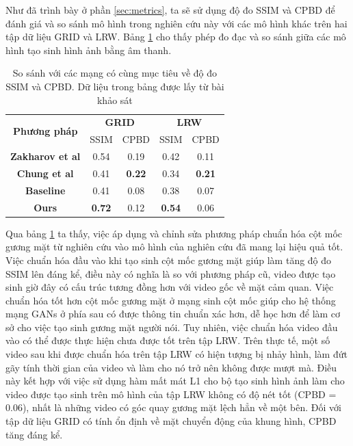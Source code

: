 Như đã trình bày ở phần \ref{sec:metrics}, ta sẽ sử dụng độ đo SSIM và CPBD để đánh giá và so sánh mô hình trong nghiên cứu này với các mô hình khác trên hai tập dữ liệu GRID và LRW. Bảng \ref{table:metrics_result} cho thấy phép đo đạc và so sánh giữa các mô hình tạo sinh hình ảnh bằng âm thanh.

\begin{table}[h]
    \centering
    \begin{tabular}{c | c | c | c | c}
    \hline 
    \multirow{2}{*}{\textbf{Phương pháp}} & \multicolumn{2}{c|}{\textbf{GRID}} & \multicolumn{2}{c}{\textbf{LRW}}\\
    \cline{2-5}
    & SSIM & CPBD & SSIM & CPBD\\
    \hline
    \textbf{Zakharov et al \cite{zakharov}} & 0.54 & 0.19 & 0.42 & 0.11 \\
    \textbf{Chung et al \cite{chung}} & 0.41 & \textbf{0.22} & 0.34 & \textbf{0.21} \\
    \textbf{Baseline \cite{chen2019}} & 0.41 & 0.08 & 0.38 & 0.07 \\
    \hline
    \hline
    \textbf{Ours} & \textbf{0.72} & 0.12 & \textbf{0.54} & 0.06 \\
    \hline
    \end{tabular}
    \caption{So sánh với các mạng có cùng mục tiêu về độ đo SSIM và CPBD. Dữ liệu trong bảng được lấy từ bài khảo sát \cite{chen_survey}}
    \label{table:metrics_result}
\end{table}

Qua bảng \ref{table:metrics_result} ta thấy, việc áp dụng và chỉnh sửa phương pháp chuẩn hóa cột mốc gương mặt từ nghiên cứu \cite{gen_face_landmark} vào mô hình của nghiên cứu \cite{chen2019} đã mang lại hiệu quả tốt. Việc chuẩn hóa đầu vào khi tạo sinh cột mốc gương mặt giúp làm tăng độ đo SSIM lên đáng kể, điều này có nghĩa là so với phương pháp cũ, video được tạo sinh giờ đây có cấu trúc tương đồng hơn với video gốc về mặt cảm quan. Việc chuẩn hóa tốt hơn cột mốc gương mặt ở mạng sinh cột mốc giúp cho hệ thống mạng GANs ở phía sau có được thông tin chuẩn xác hơn, dễ học hơn để làm cơ sở cho việc tạo sinh gương mặt người nói. Tuy nhiên, việc chuẩn hóa video đầu vào có thể được thực hiện chưa được tốt trên tập LRW. Trên thực tế, một số video sau khi được chuẩn hóa trên tập LRW có hiện tượng bị nhảy hình, làm đứt gãy tính thời gian của video và làm cho nó trở nên không được mượt mà. Điều này kết hợp với việc sử dụng hàm mất mát L1 cho bộ tạo sinh hình ảnh làm cho video được tạo sinh trên mô hình của tập LRW không có độ nét tốt (CPBD = 0.06), nhất là những video có góc quay gương mặt lệch hẳn về một bên. Đối với tập dữ liệu GRID có tính ổn định về mặt chuyển động của khung hình, CPBD tăng đáng kể.
